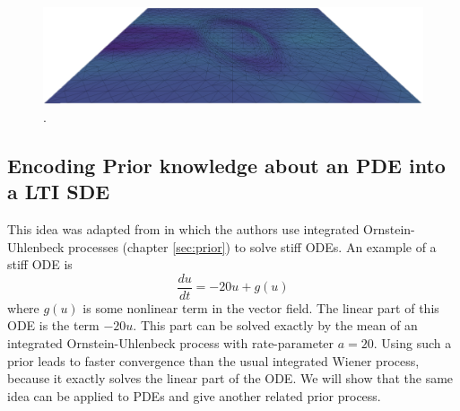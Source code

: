 \begin{figure}
    \includegraphics[width=0.9\columnwidth]{../images/bell_wave_3.png}\vspace*{3mm}
    \caption{.}
    \label{fig:bell_wave}
\end{figure}





\subsection*{Encoding Prior knowledge about an PDE into a LTI SDE}
This idea was adapted from \cite{exponential_probabilistic} in which the authors use integrated Ornstein-Uhlenbeck processes (chapter \ref{sec:prior}) to solve stiff ODEs. An example of a stiff ODE is 
$$\frac{du}{dt} = -20u + g(u)$$
where $g(u)$ is some nonlinear term in the vector field. The linear part of this ODE is the term $-20u$. This part can be solved exactly by the mean of an integrated Ornstein-Uhlenbeck process with rate-parameter $a=20$. Using such a prior leads to faster convergence than the usual integrated Wiener process, because it exactly solves the linear part of the ODE.
We will show that the same idea can be applied to PDEs and give another related prior process.
\\
